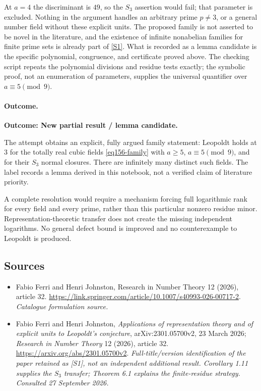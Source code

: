 \documentclass[11pt,a4paper]{article}
\newcommand{\sref}[2]{\hyperlink{source:#1:#2}{[S#2]}}
\numberwithin{equation}{section}
\begin{document}
At $a=4$ the discriminant is $49$, so the $S_3$ assertion would fail;
that parameter is excluded. Nothing in the argument handles an arbitrary
prime $p\ne3$, or a general number field without these explicit units.
The proposed family is not asserted to be novel in the literature, and the
existence of infinite nonabelian families for finite prime sets is already
part of \sref{1273}{1}. What is recorded as a lemma candidate is the
specific polynomial, congruence, and certificate proved above. The checking
script repeats the polynomial divisions and residue tests exactly; the
symbolic proof, not an enumeration of parameters, supplies the universal
quantifier over $a\equiv5\pmod9$.

\paragraph{Outcome.}
\textbf{Outcome: New partial result / lemma candidate.}

The attempt obtains an explicit, fully argued family statement:
Leopoldt holds at $3$ for the totally real cubic fields
\eqref{eq156-family} with $a\ge5$, $a\equiv5\pmod9$, and for their
$S_3$ normal closures. There are infinitely many distinct such fields.
The label records a lemma derived in this notebook, not a verified claim
of literature priority.

A complete resolution would require a mechanism forcing full logarithmic
rank for every field and every prime, rather than this particular nonzero
residue minor. Representation-theoretic transfer does not create the
missing independent logarithms. No general defect bound is improved and no
counterexample to Leopoldt is produced.
\subsection{Sources}
\begin{itemize}\raggedright
\item[\textnormal{[S1]}]\hypertarget{source:1273:1}{} Fabio Ferri and Henri Johnston, Research in Number Theory 12 (2026), article 32.
\url{https://link.springer.com/article/10.1007/s40993-026-00717-2}.
{\small\textit{Catalogue formulation source.}}
\item[\textnormal{[E1]}]\hypertarget{extra:1273:1}{} Fabio Ferri and Henri
Johnston, \emph{Applications of representation theory and of explicit units
to Leopoldt's conjecture}, arXiv:2301.05700v2, 23 March 2026;
\emph{Research in Number Theory} 12 (2026), article 32.
\url{https://arxiv.org/abs/2301.05700v2}.
{\small\textit{Full-title/version identification of the paper retained as
[S1], not an independent additional result. Corollary 1.11 supplies the
$S_3$ transfer; Theorem 6.1 explains the finite-residue strategy.
Consulted 27 September 2026.}}
\end{itemize}
\end{document}
